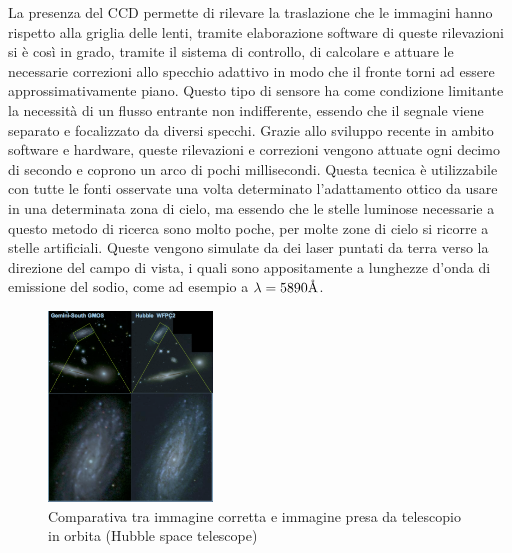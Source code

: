 La presenza del CCD permette di rilevare la traslazione che le immagini hanno rispetto alla griglia delle lenti, tramite elaborazione software di queste rilevazioni si è così in grado, tramite il sistema di controllo, di calcolare e attuare le necessarie correzioni allo specchio adattivo in modo che il fronte torni ad essere approssimativamente piano. Questo tipo di sensore ha come condizione limitante la necessità di un flusso entrante non indifferente, essendo che il segnale viene separato e focalizzato da diversi specchi. Grazie allo sviluppo recente in ambito software e hardware, queste rilevazioni e correzioni vengono attuate ogni decimo di secondo e coprono un arco di pochi millisecondi. Questa tecnica è utilizzabile con tutte le fonti osservate una volta determinato l'adattamento ottico da usare in una determinata zona di cielo, ma essendo che le stelle luminose necessarie a questo metodo di ricerca sono molto poche, per molte zone di cielo si ricorre a stelle artificiali. Queste vengono simulate da dei laser puntati da terra verso la direzione del campo di vista, i quali sono appositamente a lunghezze d'onda di emissione del sodio, come ad esempio a $\lambda=5890\mbox{\normalfont\AA}$.

\begin{figure}
    \centering
    \vspace{-5pt}
    \includegraphics[width=0.39\textwidth]{Immagini/Capitolo2/Seeing_vs_Hubble.PNG}
    \caption{Comparativa tra immagine corretta e immagine presa da telescopio in orbita (Hubble space telescope)}
    \label{im:seeingvsHubble}
    \vspace{-5pt}
\end{figure}
 
